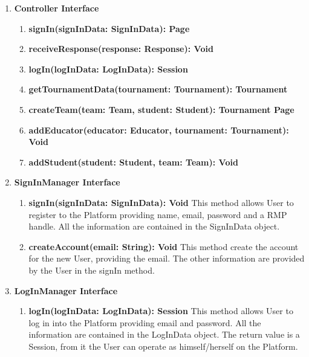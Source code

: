 \begin{enumerate}
    \item \textbf{Controller Interface}
            \begin{enumerate}[label=$\bullet$]
                \item \textbf{signIn(signInData: SignInData): Page}
                \item \textbf{receiveResponse(response: Response): Void}
                \item \textbf{logIn(logInData: LogInData): Session}
                \item \textbf{getTournamentData(tournament: Tournament): Tournament}
                \item \textbf{createTeam(team: Team, student: Student): Tournament Page}
                \item \textbf{addEducator(educator: Educator, tournament: Tournament): Void}
                \item \textbf{addStudent(student: Student, team: Team): Void}
            \end{enumerate}
    \item \textbf{SignInManager Interface} 
            \begin{enumerate}[label=$\bullet$]
                \item \textbf{signIn(signInData: SignInData): Void} This method allows User to register to the Platform providing name, email, password and a RMP handle. All the information are contained in the SignInData object.
                \item \textbf{createAccount(email: String): Void} This method create the account for the new User, providing the email. The other information are provided by the User in the signIn method.
            \end{enumerate}
    \item \textbf{LogInManager Interface}
        \begin{enumerate}[label=$\bullet$]
            \item \textbf{logIn(logInData: LogInData): Session} This method allows User to log in into the Platform providing email and password. All the information are contained in the LogInData object. The return value is a Session,
            from it the User can operate as himself/herself on the Platform.

\end{enumerate}
\end{enumerate}
